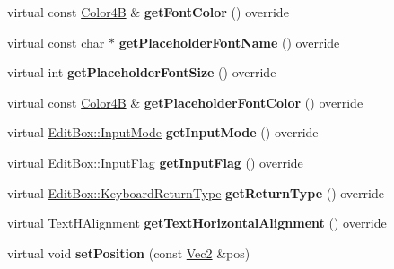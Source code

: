 \begin{DoxyCompactItemize}
virtual const \hyperlink{structColor4B}{Color4B} \& {\bfseries get\+Font\+Color} () override
\item 
\mbox{\label{classui_1_1EditBoxImplTizen_a014464d0bfa739f5a1ca97ee3b23a776}} 
virtual const char $\ast$ {\bfseries get\+Placeholder\+Font\+Name} () override
\item 
\mbox{\label{classui_1_1EditBoxImplTizen_a02e9be774191aff156fc14ec0ebc1db7}} 
virtual int {\bfseries get\+Placeholder\+Font\+Size} () override
\item 
\mbox{\label{classui_1_1EditBoxImplTizen_a154e4b03d756806f3914259908eaf418}} 
virtual const \hyperlink{structColor4B}{Color4B} \& {\bfseries get\+Placeholder\+Font\+Color} () override
\item 
\mbox{\label{classui_1_1EditBoxImplTizen_abe3c5e28aff899d226d70dde00e184f7}} 
virtual \hyperlink{classui_1_1EditBox_a7a1bfe8f3ba218bedfcf5451ec3ce01a}{Edit\+Box\+::\+Input\+Mode} {\bfseries get\+Input\+Mode} () override
\item 
\mbox{\label{classui_1_1EditBoxImplTizen_a30932328a7b9cf0b5fdcfd84d0f521ed}} 
virtual \hyperlink{classui_1_1EditBox_af02f13ee9fba51d59bb3111e200848c8}{Edit\+Box\+::\+Input\+Flag} {\bfseries get\+Input\+Flag} () override
\item 
\mbox{\label{classui_1_1EditBoxImplTizen_a88f988426ab1e6e1ca72f591f90fab74}} 
virtual \hyperlink{classui_1_1EditBox_a1e1285b6f742975b26bdeb8108ca6e51}{Edit\+Box\+::\+Keyboard\+Return\+Type} {\bfseries get\+Return\+Type} () override
\item 
\mbox{\label{classui_1_1EditBoxImplTizen_abafa6dc8ecc8ec9e933e2bde4f305929}} 
virtual Text\+H\+Alignment {\bfseries get\+Text\+Horizontal\+Alignment} () override
\item 
\mbox{\label{classui_1_1EditBoxImplTizen_ad752fca0fa6bab04d894de318b5927ea}} 
virtual void {\bfseries set\+Position} (const \hyperlink{classVec2}{Vec2} \&pos)
\item 
\mbox{\label{classui_1_1EditBoxImplTizen_a05f85aacde938e2e4123f2565e789796}} 

\end{DoxyCompactItemize}
